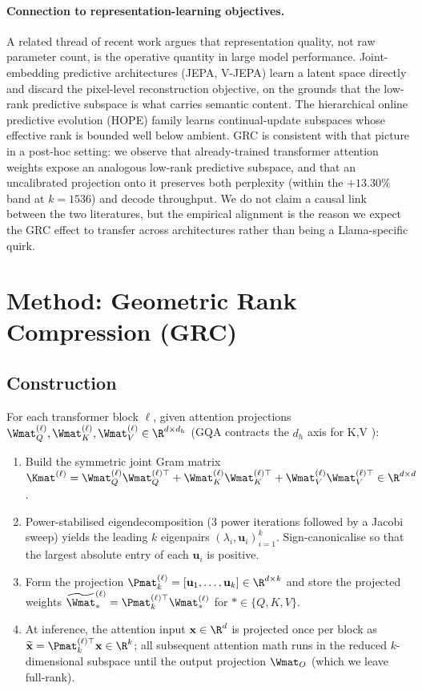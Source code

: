 \documentclass[11pt]{article}
\begin{document}
\paragraph{Connection to representation-learning objectives.}
A related thread of recent work argues that representation quality, not
raw parameter count, is the operative quantity in large model performance.
Joint-embedding predictive architectures (JEPA, V-JEPA)
\cite{assran2023ijepa,bardes2024vjepa} learn a latent space directly and
discard the pixel-level reconstruction objective, on the grounds that the
low-rank predictive subspace is what carries semantic content. The
hierarchical online predictive evolution (HOPE) family
\cite{behrouz2025hope} learns continual-update subspaces whose effective
rank is bounded well below ambient. GRC is consistent with that picture in
a post-hoc setting: we observe that already-trained transformer attention
weights expose an analogous low-rank predictive subspace, and that an
uncalibrated projection onto it preserves both perplexity (within the
$+13.30\%$ band at $k{=}1536$) and decode throughput. We do not claim a
causal link between the two literatures, but the empirical alignment is the
reason we expect the GRC effect to transfer across architectures rather
than being a Llama-specific quirk.

\section{Method: Geometric Rank Compression (GRC)}
\label{sec:method}

\subsection{Construction}
For each transformer block $\ell$, given attention projections
$\Wmat_Q^{(\ell)},\Wmat_K^{(\ell)},\Wmat_V^{(\ell)}\in\R^{d\times d_h}$
(GQA contracts the $d_h$ axis for K,V \cite{ainslie2023gqa}):
\begin{enumerate}
\item Build the symmetric joint Gram matrix
$\Kmat^{(\ell)} = \Wmat_Q^{(\ell)}\Wmat_Q^{(\ell)\top}+\Wmat_K^{(\ell)}\Wmat_K^{(\ell)\top}+\Wmat_V^{(\ell)}\Wmat_V^{(\ell)\top}\in\R^{d\times d}$.
\item Power-stabilised eigendecomposition (3 power iterations followed by a
Jacobi sweep) yields the leading $k$ eigenpairs
$(\lambda_i,\mathbf{u}_i)_{i=1}^k$.  Sign-canonicalise so that the largest
absolute entry of each $\mathbf{u}_i$ is positive.
\item Form the projection $\Pmat_k^{(\ell)}=[\mathbf{u}_1,\dots,\mathbf{u}_k]
\in\R^{d\times k}$ and store the projected weights
$\widetilde{\Wmat}_*^{(\ell)} = \Pmat_k^{(\ell)\top}\Wmat_*^{(\ell)}$ for
$*\in\{Q,K,V\}$.
\item At inference, the attention input $\mathbf{x}\in\R^d$ is projected once
per block as $\widetilde{\mathbf{x}} = \Pmat_k^{(\ell)\top}\mathbf{x}\in\R^k$;
all subsequent attention math runs in the reduced $k$-dimensional subspace
until the output projection $\Wmat_O$ (which we leave full-rank).
\end{enumerate}
\end{document}
